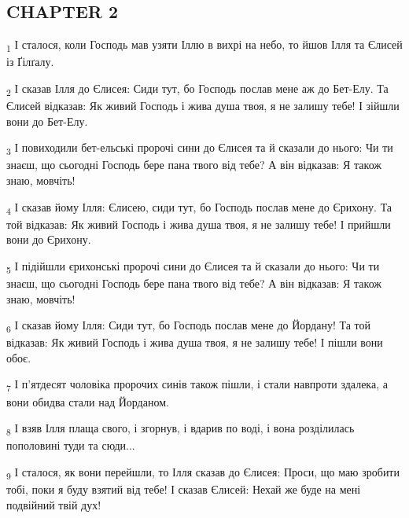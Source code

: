 \subsection{CHAPTER 2}
\begin{tcolorbox}
\textsubscript{1} І сталося, коли Господь мав узяти Іллю в вихрі на небо, то йшов Ілля та Єлисей із Ґілґалу.
\end{tcolorbox}
\begin{tcolorbox}
\textsubscript{2} І сказав Ілля до Єлисея: Сиди тут, бо Господь послав мене аж до Бет-Елу. Та Єлисей відказав: Як живий Господь і жива душа твоя, я не залишу тебе! І зійшли вони до Бет-Елу.
\end{tcolorbox}
\begin{tcolorbox}
\textsubscript{3} І повиходили бет-ельські пророчі сини до Єлисея та й сказали до нього: Чи ти знаєш, що сьогодні Господь бере пана твого від тебе? А він відказав: Я також знаю, мовчіть!
\end{tcolorbox}
\begin{tcolorbox}
\textsubscript{4} І сказав йому Ілля: Єлисею, сиди тут, бо Господь послав мене до Єрихону. Та той відказав: Як живий Господь і жива душа твоя, я не залишу тебе! І прийшли вони до Єрихону.
\end{tcolorbox}
\begin{tcolorbox}
\textsubscript{5} І підійшли єрихонські пророчі сини до Єлисея та й сказали до нього: Чи ти знаєш, що сьогодні Господь бере пана твого від тебе? А він відказав: Я також знаю, мовчіть!
\end{tcolorbox}
\begin{tcolorbox}
\textsubscript{6} І сказав йому Ілля: Сиди тут, бо Господь послав мене до Йордану! Та той відказав: Як живий Господь і жива душа твоя, я не залишу тебе! І пішли вони обоє.
\end{tcolorbox}
\begin{tcolorbox}
\textsubscript{7} І п'ятдесят чоловіка пророчих синів також пішли, і стали навпроти здалека, а вони обидва стали над Йорданом.
\end{tcolorbox}
\begin{tcolorbox}
\textsubscript{8} І взяв Ілля плаща свого, і згорнув, і вдарив по воді, і вона розділилась пополовині туди та сюди...
\end{tcolorbox}
\begin{tcolorbox}
\textsubscript{9} І сталося, як вони перейшли, то Ілля сказав до Єлисея: Проси, що маю зробити тобі, поки я буду взятий від тебе! І сказав Єлисей: Нехай же буде на мені подвійний твій дух!
\end{tcolorbox}
